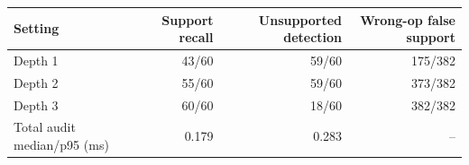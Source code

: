 \begin{tabular}{lrrr}
\toprule
Setting & Support recall & Unsupported detection & Wrong-op false support \\
\midrule
Depth 1 & 43/60 & 59/60 & 175/382 \\
Depth 2 & 55/60 & 59/60 & 373/382 \\
Depth 3 & 60/60 & 18/60 & 382/382 \\
\midrule
Total audit median/p95 (ms) & 0.179 & 0.283 & -- \\
\bottomrule
\end{tabular}
